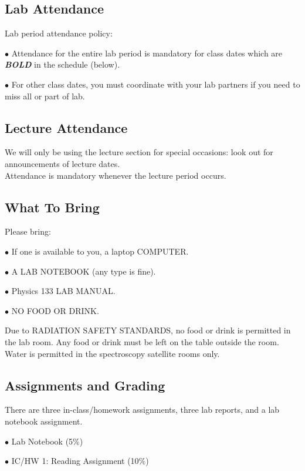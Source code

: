 \documentclass[10pt]{article}
\newcommand{\spfont}[1]{\textit{\textbf{\large #1}}}
\begin{document}
\subsection*{Lab Attendance}
Lab period attendance policy:

$\bullet$ Attendance for the entire lab period is mandatory for class dates which are \spfont{BOLD} in the schedule (below).

$\bullet$ For other class dates, you must coordinate with your lab partners if you need to miss all or part of lab.

\subsection*{Lecture Attendance}
We will only be using the lecture section for special occasions: look out for announcements of lecture dates. \\
Attendance is mandatory whenever the lecture period occurs. 





\subsection*{What To Bring}

Please bring:

$\bullet$ If one is available to you, a laptop COMPUTER.

$\bullet$ A LAB NOTEBOOK (any type is fine).

$\bullet$ Physics 133 LAB MANUAL.

$\bullet$ NO FOOD OR DRINK. 

\noindent
Due to RADIATION SAFETY STANDARDS, no food or drink is permitted in the lab room. Any food or drink must be left on the table outside the room. Water is permitted in the spectroscopy satellite rooms only.



\clearpage




\subsection*{Assignments and Grading}

There are three in-class/homework assignments, three lab reports, and a lab notebook assignment.

$\bullet$ Lab Notebook (5\%)

$\bullet$ IC/HW 1: Reading Assignment (10\%)
\end{document}
